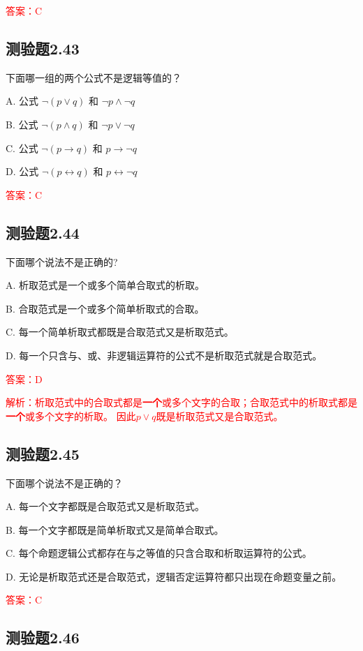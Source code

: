 \documentclass[UTF8, heading=true]{ctexart}
\begin{document}
\textcolor{red}{答案：C}

\subsection{测验题2.43}

下面哪一组的两个公式不是逻辑等值的？

A. 公式 $\neg(p \vee q)$ 和 $\neg p \wedge \neg q$

B. 公式 $\neg(p \wedge q)$ 和 $\neg p \vee \neg q$

C. 公式 $\neg(p \rightarrow q)$ 和 $p \rightarrow \neg q$

D. 公式 $\neg(p \leftrightarrow q)$ 和 $p \leftrightarrow \neg q$

\textcolor{red}{答案：C}

\subsection{测验题2.44}

下面哪个说法不是正确的?

A. 析取范式是一个或多个简单合取式的析取。

B. 合取范式是一个或多个简单析取式的合取。

C. 每一个简单析取式都既是合取范式又是析取范式。

D. 每一个只含与、或、非逻辑运算符的公式不是析取范式就是合取范式。

\textcolor{red}{答案：D}

\textcolor{red}{解析：析取范式中的合取式都是\textbf{一个}或多个文字的合取；合取范式中的析取式都是\textbf{一个}或多个文字的析取。
因此$p \vee q$既是析取范式又是合取范式。}

\subsection{测验题2.45}

下面哪个说法不是正确的？

A. 
每一个文字都既是合取范式又是析取范式。

B. 
每一个文字都既是简单析取式又是简单合取式。

C. 
每个命题逻辑公式都存在与之等值的只含合取和析取运算符的公式。

D. 
无论是析取范式还是合取范式，逻辑否定运算符都只出现在命题变量之前。

\textcolor{red}{答案：C}

\subsection{测验题2.46}
\end{document}
